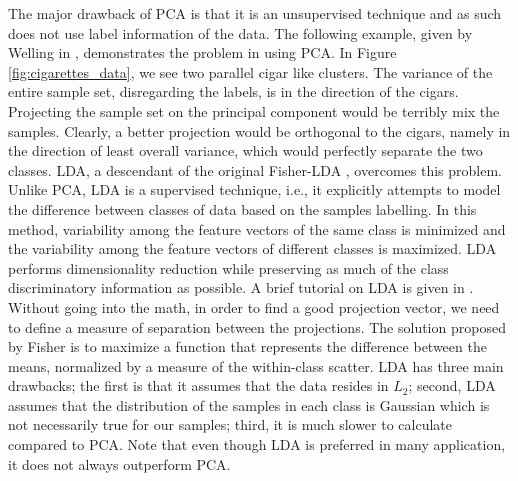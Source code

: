 \iftoggle{edit-mode}{\hspace{0pt}\marginpar{LDA}}{}
The major drawback of PCA is that it is an unsupervised technique and as such does not use label information of the data. 
The following example, given by Welling in \cite{welling2005fisher}, demonstrates the problem in using PCA. 
In Figure \ref{fig:cigarettes_data}, we see two parallel cigar like clusters. 
The variance of the entire sample set, disregarding the labels, is in the direction of the cigars. 
Projecting the sample set on the principal component would be terribly mix the samples. 
Clearly, a better projection would be orthogonal to the cigars, namely in the direction of least overall variance, which would perfectly separate the two classes.
LDA, a descendant of the original Fisher-LDA \cite{fisher1936use}, overcomes this problem. 
Unlike PCA, LDA is a supervised technique, i.e., it explicitly attempts to model the difference between classes of data based on the samples labelling. 
In this method, variability among the feature vectors of the same class is minimized and the variability among the feature vectors of different classes is maximized. 
LDA performs dimensionality reduction while preserving as much of the class discriminatory information as possible. 
A brief tutorial on LDA is given in \cite{balakrishnama1998linear}. 
Without going into the math, in order to find a good projection vector, we need to define a measure of separation between the projections. 
The solution proposed by Fisher is to maximize a function that represents the difference between the means, normalized by a measure of the within-class scatter. 
LDA has three main drawbacks; the first is that it assumes that the data resides in $L_2$; second, LDA assumes that the distribution of the samples in each class is Gaussian which is not necessarily true for our samples; third, it is much slower to calculate compared to PCA.
Note that even though LDA is preferred in many application, it does not always outperform PCA.  


